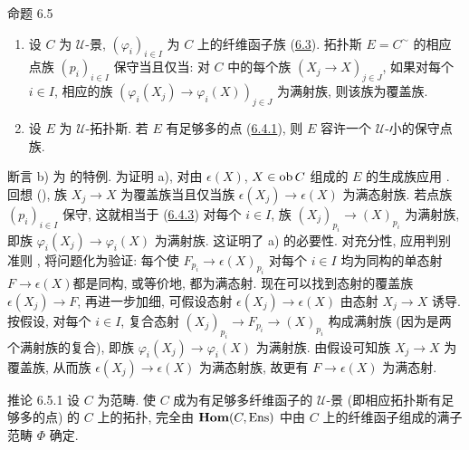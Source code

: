 

\begin{enonce*}{命题 6.5}
\begin{enumerate}
\renewcommand{\theenumi}{\alph{enumi}}
\renewcommand{\labelenumi}{\theenumi)}
\item 设 $C$ 为 $𝒰$-景, $(\varphi_i)_{i\in I}$ 为 $C$ 上的纤维函子族 (\hyperref[IV.subsec6.3]{6.3}). 拓扑斯 $E=C^{\sim}$ 的相应点族 $(p_i)_{i\in I}$ 保守当且仅当: 对 $C$ 中的每个族 $(X_j\rightarrow X)_{j\in J}$, 如果对每个 $i\in I$, 相应的族 $(\varphi_i(X_j)\rightarrow\varphi_i(X))_{j\in J}$ 为满射族, 则该族为覆盖族.

\item 设 $E$ 为 $𝒰$-拓扑斯. 若 $E$ 有足够多的点 (\hyperref[IV.def6.4.1]{6.4.1}), 则 $E$ 容许一个 $𝒰$-小的保守点族.
\end{enumerate}
\end{enonce*}



断言 b) 为  的特例. 为证明 a), 对由 $\epsilon(X)$, $X\in\operatorname{ob} C$ 组成的 $E$ 的生成族应用 . 回想 (), 族 $X_j\rightarrow X$ 为覆盖族当且仅当族 $\epsilon(X_j)\rightarrow\epsilon(X)$ 为满态射族. 若点族 $(p_i)_{i\in I}$ 保守, 这就相当于 (\hyperref[IV.subsubsec6.4.3]{6.4.3}) 对每个 $i\in I$, 族 $(X_j)_{p_i}\rightarrow(X)_{p_i}$ 为满射族, 即族 $\varphi_i(X_j)\rightarrow\varphi_i(X)$ 为满射族. 这证明了 a) 的必要性. 对充分性, 应用判别准则 , 将问题化为验证: 每个使 $F_{p_i}\rightarrow\epsilon(X)_{p_i}$ 对每个 $i\in I$ 均为同构的单态射 $F\rightarrow\epsilon(X)$\pageoriginale 都是同构, 或等价地, 都为满态射. 现在可以找到态射的覆盖族 $\epsilon(X_j)\rightarrow F$, 再进一步加细, 可假设态射 $\epsilon(X_j)\rightarrow\epsilon(X)$ 由态射 $X_j\rightarrow X$ 诱导. 按假设, 对每个 $i\in I$, 复合态射 $(X_j)_{p_i}\rightarrow F_{p_i}\rightarrow(X)_{p_i}$ 构成满射族 (因为是两个满射族的复合), 即族 $\varphi_i(X_j)\rightarrow\varphi_i(X)$ 为满射族. 由假设可知族 $X_j\to X$ 为覆盖族, 从而族 $\epsilon(X_j)\rightarrow\epsilon(X)$ 为满态射族, 故更有 $F\rightarrow\epsilon(X)$ 为满态射.

\begin{enonce*}{推论 6.5.1}
设 $C$ 为范畴. 使 $C$ 成为有足够多纤维函子的 $𝒰$-景 (即相应拓扑斯有足够多的点) 的 $C$ 上的拓扑, 完全由 $\operatorname{\mathbf{Hom}}(C,\operatorname{Ens})$ 中由 $C$ 上的纤维函子组成的满子范畴 $\Phi$ 确定.
\end{enonce*}

